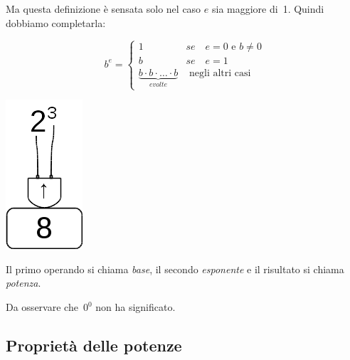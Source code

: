 Ma questa definizione è sensata solo nel caso $e$ sia maggiore di~1.
Quindi dobbiamo completarla:

\begin{inaccessibleblock}[
	\begin{definizione}
		$$
		b^e = \begin{cases}
		1 & se \quad e = 0 \text{ e } b\neq 0\\
		b & se \quad e = 1\\
		\mbox{e volte}{b \cdot b \cdot \dots \cdot b} & \mbox{ negli altri casi}
		\end{cases}$$
	\end{definizione}
	]
	\begin{definizione}
		$$
		b^e = \begin{cases}
		1 & se \quad e = 0 \text{ e } b\neq 0\\
		b & se \quad e = 1\\
		\underbrace{b \cdot b \cdot \dots \cdot b}_{e volte} & \text{ negli altri casi}
		\end{cases}$$
	\end{definizione}
\end{inaccessibleblock}


\begin{inaccessibleblock}[]
\begin{minipage}{0.80\textwidth}
 \centering
   
\end{minipage}%
\begin{minipage}{0.15\textwidth}
 \centering
 \includegraphics[scale=0.35]{img/op_pot.png}
\end{minipage}%
\end{inaccessibleblock}

Il primo operando si chiama \emph{base}, il secondo \emph{esponente} e il 
risultato si chiama \emph{potenza}.

Da osservare che~$0^0$ non ha significato.

\subsection{Proprietà delle potenze}

